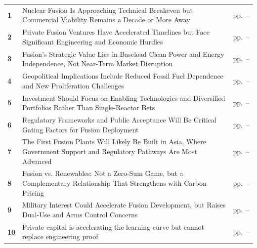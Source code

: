 \documentclass[10pt,a4paper]{article}
\begin{document}
\begin{tabularx}{\linewidth}{p{8mm}Yp{29mm}}
\textcolor{BOBlue}{\bfseries 1} & Nuclear Fusion Is Approaching Technical Breakeven but Commercial Viability Remains a Decade or More Away & {\color{BOMuted}pp.~\pageref{chap:1}--\pageref{chap:1:end}} \\[3pt]
\textcolor{BOBlue}{\bfseries 2} & Private Fusion Ventures Have Accelerated Timelines but Face Significant Engineering and Economic Hurdles & {\color{BOMuted}pp.~\pageref{chap:2}--\pageref{chap:2:end}} \\[3pt]
\textcolor{BOBlue}{\bfseries 3} & Fusion's Strategic Value Lies in Baseload Clean Power and Energy Independence, Not Near-Term Market Disruption & {\color{BOMuted}pp.~\pageref{chap:3}--\pageref{chap:3:end}} \\[3pt]
\textcolor{BOBlue}{\bfseries 4} & Geopolitical Implications Include Reduced Fossil Fuel Dependence and New Proliferation Challenges & {\color{BOMuted}pp.~\pageref{chap:4}--\pageref{chap:4:end}} \\[3pt]
\textcolor{BOBlue}{\bfseries 5} & Investment Should Focus on Enabling Technologies and Diversified Portfolios Rather Than Single-Reactor Bets & {\color{BOMuted}pp.~\pageref{chap:5}--\pageref{chap:5:end}} \\[3pt]
\textcolor{BOBlue}{\bfseries 6} & Regulatory Frameworks and Public Acceptance Will Be Critical Gating Factors for Fusion Deployment & {\color{BOMuted}pp.~\pageref{chap:6}--\pageref{chap:6:end}} \\[3pt]
\textcolor{BOBlue}{\bfseries 7} & The First Fusion Plants Will Likely Be Built in Asia, Where Government Support and Regulatory Pathways Are Most Advanced & {\color{BOMuted}pp.~\pageref{chap:7}--\pageref{chap:7:end}} \\[3pt]
\textcolor{BOBlue}{\bfseries 8} & Fusion vs. Renewables: Not a Zero-Sum Game, but a Complementary Relationship That Strengthens with Carbon Pricing & {\color{BOMuted}pp.~\pageref{chap:8}--\pageref{chap:8:end}} \\[3pt]
\textcolor{BOBlue}{\bfseries 9} & Military Interest Could Accelerate Fusion Development, but Raises Dual-Use and Arms Control Concerns & {\color{BOMuted}pp.~\pageref{chap:9}--\pageref{chap:9:end}} \\[3pt]
\textcolor{BOBlue}{\bfseries 10} & Private capital is accelerating the learning curve but cannot replace engineering proof & {\color{BOMuted}pp.~\pageref{chap:10}--\pageref{chap:10:end}} \\[3pt]
\end{tabularx}
\clearpage
\end{document}
